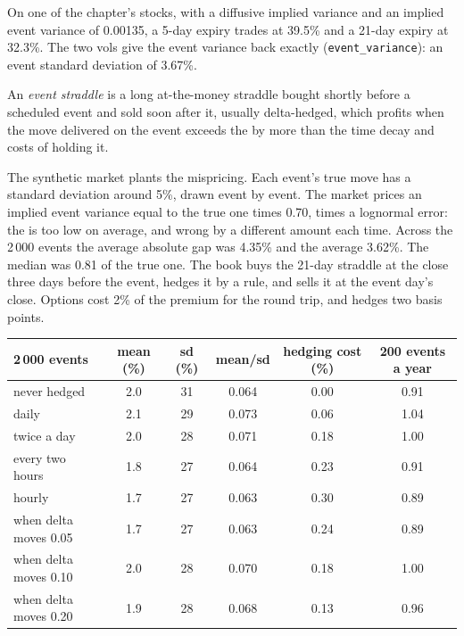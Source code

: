 On one of the chapter's stocks, with a diffusive implied variance and an implied event variance of 0.00135, a 5-day expiry trades at 39.5\% and a
21-day expiry at 32.3\%. The two vols give the event variance back exactly (\texttt{event\_variance}): an event standard deviation of 3.67\%.

\begin{definition}\label{def:s2:gamma-scalping-and-event-volatility:straddle}
An \emph{event straddle} is a long at-the-money straddle bought shortly before a scheduled event and sold soon after it, usually
delta-hedged, which profits when the move delivered on the event exceeds the  by more than the time decay and costs of holding it.
\end{definition}

The synthetic market plants the mispricing. Each event's true move has a standard deviation around 5\%, drawn event by event. The market prices an
implied event variance equal to the true one times 0.70, times a lognormal error: the  is too low on average, and wrong by a different
amount each time. Across the 2\,000 events the average absolute gap was 4.35\% and the average  3.62\%. The median  was 0.81 of
the true one. The book buys the 21-day straddle at the close three days before the event, hedges it by a rule, and sells it at the event day's close.
Options cost 2\% of the premium for the round trip, and hedges two basis points.

\begin{center}
\small
\begin{tabular}{@{}lccccc@{}}
\toprule
2\,000 events & mean (\%) & sd (\%) & mean/sd & hedging cost (\%) & 200 events a year\\
\midrule
never hedged & 2.0 & 31 & 0.064 & 0.00 & 0.91\\
daily & 2.1 & 29 & 0.073 & 0.06 & 1.04\\
twice a day & 2.0 & 28 & 0.071 & 0.18 & 1.00\\
every two hours & 1.8 & 27 & 0.064 & 0.23 & 0.91\\
hourly & 1.7 & 27 & 0.063 & 0.30 & 0.89\\
when delta moves 0.05 & 1.7 & 27 & 0.063 & 0.24 & 0.89\\
when delta moves 0.10 & 2.0 & 28 & 0.070 & 0.18 & 1.00\\
when delta moves 0.20 & 1.9 & 28 & 0.068 & 0.13 & 0.96\\
\bottomrule
\end{tabular}
\end{center}

